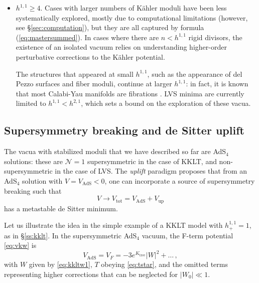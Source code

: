 \documentclass[12pt,a4wide]{article}
\begin{document}
\begin{itemize}
\item $h^{1,1}\geq 4$. Cases with larger numbers of K\"ahler moduli have been less  systematically explored, mostly due to computational limitations (however, see \S\ref{sec:computation}), but they are all captured by formula (\ref{eq:mastersummed}). 
In cases where there are $n<h^{1,1}$  rigid divisors, 
the existence of an isolated vacuum
relies on understanding higher-order perturbative corrections to the K\"ahler potential.
 
The structures that appeared at small $h^{1,1}$, such as the appearance of
del Pezzo surfaces and fiber moduli, continue at larger $h^{1,1}$:
in fact, it is known that most Calabi-Yau manifolds are fibrations \cite{Rohsiepe:2005qg,Johnson:2014xpa,Candelas:2012uu,Gray:2014fla}.  
LVS minima are currently limited to $h^{1,1}<h^{2,1}$,  which sets a bound on the exploration of these vacua.
 
\end{itemize}




\subsection{Supersymmetry breaking and de Sitter uplift}

The vacua with stabilized moduli that we have described so far are AdS$_4$ solutions: these are $\mathcal{N}=1$ supersymmetric in the case of KKLT, and non-supersymmetric in the case of LVS.
The \emph{uplift} paradigm \cite{Kachru:2003aw} proposes that from an AdS$_4$ solution with $V=V_{\text{AdS}}<0$, one can incorporate a source of supersymmetry breaking such that
\begin{equation}\label{eq:uplift}
V \to V_{\text{tot}} = V_{\text{AdS}} + V_{\text{up}}
\end{equation} has a metastable de Sitter minimum.

Let us illustrate the idea in the simple example of a KKLT model with $h^{1,1}_{+}=1$, as in 
\S\ref{ss:kklt}.  In the supersymmetric AdS$_4$ vacuum, the F-term potential \eqref{eq:vkw} is
\begin{equation}\label{eq:vadsk}
    V_{\text{AdS}} = V_F = -3e^{K_{\text{tree}}}|W|^2+\ldots\,,
\end{equation} with $W$ given by \eqref{eq:kkltw1}, $T$ obeying \eqref{eq:tstar}, and the omitted terms representing higher corrections that can be neglected for $|W_0|\ll 1$.
\end{document}
